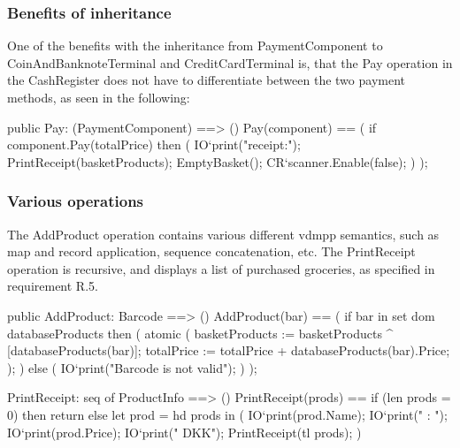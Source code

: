\subsubsection{Benefits of inheritance}
One of the benefits with the inheritance from PaymentComponent to CoinAndBanknoteTerminal and CreditCardTerminal is, that the Pay operation in the CashRegister does not have to differentiate between the two payment methods, as seen in the following:
\begin{vdmpp}
 public Pay: (PaymentComponent) ==> ()
 Pay(component) ==
  (
   if component.Pay(totalPrice) then
   (
    IO`print("\nPayment receipt:\n");
    PrintReceipt(basketProducts);
    EmptyBasket();
    CR`scanner.Enable(false);
   )
  );
\end{vdmpp}


\subsubsection{Various operations}
The AddProduct operation contains various different vdmpp semantics, such as map and record application, sequence concatenation, etc.
The PrintReceipt operation is recursive, and displays a list of purchased groceries, as specified in requirement R.5.
\begin{vdmpp}
 public AddProduct: Barcode ==> ()
 AddProduct(bar) ==
  (
   if bar in set dom databaseProducts then
   (
    atomic
    (
     basketProducts := basketProducts ^ [databaseProducts(bar)];
     totalPrice := totalPrice + databaseProducts(bar).Price;
    );
   )
   else 
   (
    IO`print("Barcode is not valid\n");
   )
  );

 PrintReceipt: seq of ProductInfo ==> ()
 PrintReceipt(prods) ==
  if (len prods = 0) then
   return
  else
   let prod = hd prods
    in 
    (
     IO`print(prod.Name);
     IO`print(" : ");
     IO`print(prod.Price);
     IO`print(" DKK\n");
     PrintReceipt(tl prods);
    )
\end{vdmpp}